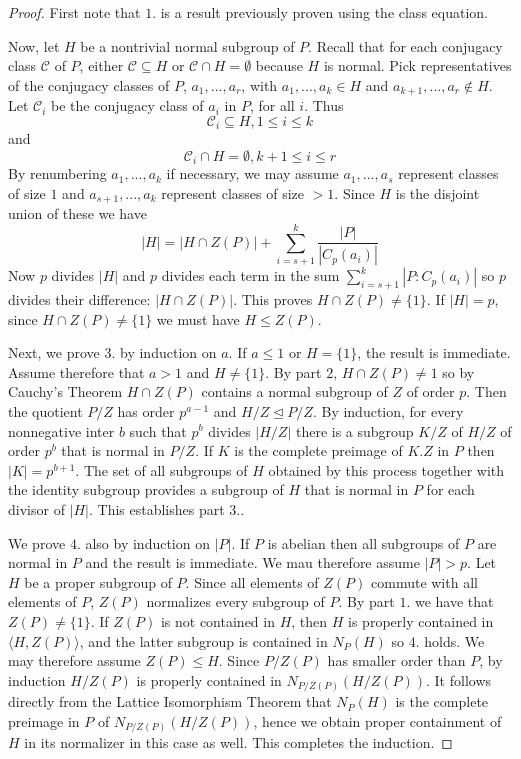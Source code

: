 \begin{proof}
    First note that $1.$ is a result previously proven using the class equation.

    Now, let $H$ be a nontrivial normal subgroup of $P$. Recall that for each conjugacy class $\mathcal{C}$ of $P$, either $\mathcal{C} \subseteq H$ or $\mathcal{C} \cap H = \emptyset$ because $H$ is normal. Pick representatives of the conjugacy classes of $P$, $a_1,...,a_r$, with $a_1,...,a_k \in H$ and $a_{k+1},...,a_r \notin H$. Let $\mathcal{C}_i$ be the conjugacy class of $a_i$ in $P$, for all $i$. Thus \begin{equation*}
        \mathcal{C}_i \subseteq H, 1 \leq i \leq k
    \end{equation*}
    and \begin{equation*}
        \mathcal{C}_i\cap H = \emptyset, k+1\leq i \leq r
    \end{equation*}
    By renumbering $a_1,...,a_k$ if necessary, we may assume $a_1,...,a_s$ represent classes of size $1$ and $a_{s+1},...,a_k$ represent classes of size $> 1$. Since $H$ is the disjoint union of these we have \begin{equation*}
        |H| = |H\cap Z(P)| + \sum\limits_{i=s+1}^k\frac{|P|}{|C_p(a_i)|}
    \end{equation*}
    Now $p$ divides $|H|$ and $p$ divides each term in the sum $\sum_{i=s+1}^k|P:C_p(a_i)|$ so $p$ divides their difference: $|H\cap Z(P)|$. This proves $H\cap Z(P) \neq \{1\}$. If $|H| = p$, since $H\cap Z(P) \neq \{1\}$ we must have $H \leq Z(P)$. 

    Next, we prove $3.$ by induction on $a$. If $a \leq 1$ or $H = \{1\}$, the result is immediate. Assume therefore that $a > 1$ and $H \neq \{1\}$. By part $2$, $H\cap Z(P) \neq 1$ so by Cauchy's Theorem $H\cap Z(P)$ contains a normal subgroup of $Z$ of order $p$. Then the quotient $P/Z$ has order $p^{a-1}$ and $H/Z\trianglelefteq P/Z$. By induction, for every nonnegative inter $b$ such that $p^b$ divides $|H/Z|$ there is a subgroup $K/Z$ of $H/Z$ of order $p^b$ that is normal in $P/Z$. If $K$ is the complete preimage of $K.Z$ in $P$ then $|K| = p^{b+1}$. The set of all subgroups of $H$ obtained by this process together with the identity subgroup provides a subgroup of $H$ that is normal in $P$ for each divisor of $|H|$. This establishes part $3.$.

    We prove $4.$ also by induction on $|P|$. If $P$ is abelian then all subgroups of $P$ are normal in $P$ and the result is immediate. We mau therefore assume $|P| > p$. Let $H$ be a proper subgroup of $P$. Since all elements of $Z(P)$ commute with all elements of $P$, $Z(P)$ normalizes every subgroup of $P$. By part $1.$ we have that $Z(P) \neq \{1\}$. If $Z(P)$ is not contained in $H$, then $H$ is properly contained in $\langle H,Z(P)\rangle$, and the latter subgroup is contained in $N_P(H)$ so $4.$ holds. We may therefore assume $Z(P) \leq H$. Since $P/Z(P)$ has smaller order than $P$, by induction $H/Z(P)$ is properly contained in $N_{P/Z(P)}(H/Z(P))$. It follows directly from the Lattice Isomorphism Theorem that $N_P(H)$ is the complete preimage in $P$ of $N_{P/Z(P)}(H/Z(P))$, hence we obtain proper containment of $H$ in its normalizer in this case as well. This completes the induction.


\end{proof}
